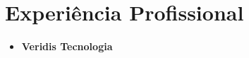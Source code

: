 \documentclass[a4paper,10pt]{article}
\begin{document}
  \section{Experiência Profissional}
    \begin{itemize}
      \item  
        \textbf{Veridis Tecnologia}




\end{itemize}
\end{document}
